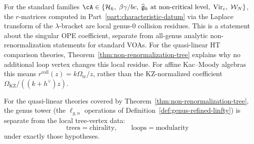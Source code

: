 \begin{corollary}
\label{cor:exact-r-matrix}
For the standard families $\cA \in \{\mathcal{H}_k,\;
\beta\gamma/bc,\; \widehat{\mathfrak{g}}_k \text{ at non-critical
level},\; \mathrm{Vir}_c,\; \mathcal{W}_N\}$, the $r$-matrices
computed in Part~\ref{part:characteristic-datum} via the Laplace
transform of the $\lambda$-bracket are local genus-$0$ collision
residues.  This is a statement about the singular OPE coefficient,
separate from all-genus analytic non-renormalization statements for
standard VOAs.  For the quasi-linear HT comparison theories,
Theorem~\ref{thm:non-renormalization-tree} explains why no additional
loop vertex changes this local residue.
For affine Kac--Moody algebras this means
$r^{\mathrm{coll}}(z)=k\Omega_{\mathrm{tr}}/z$, rather than the
KZ-normalized coefficient $\Omega_{\mathrm{KZ}}/((k+h^\vee)z)$.
\end{corollary}

\begin{remark}
\label{rem:trees-loops-separation}
For the quasi-linear theories covered by
Theorem~\ref{thm:non-renormalization-tree}, the genus tower (the
$\ell_{g,n}$ operations of Definition~\ref{def:genus-refined-linfty})
is separate from the local tree-vertex data:
\[
 \text{trees} = \text{chirality},
 \qquad
 \text{loops} = \text{modularity}
\]
under exactly those hypotheses.
\end{remark}

